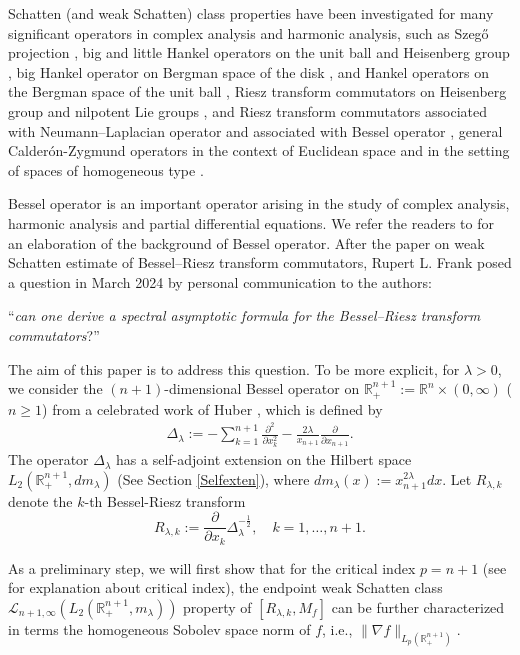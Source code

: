 \documentclass[12pt]{amsart}
\begin{document}
Schatten  (and weak Schatten) class properties have been investigated for many significant operators in complex analysis and harmonic analysis, such as Szeg\H{o} projection \cite{FR}, big and little Hankel operators on the unit ball and  Heisenberg group \cite{FR},  big Hankel operator on Bergman space of the disk  \cite{AFP}, and  Hankel operators on the Bergman space of the unit ball \cite{MR1087805}, Riesz transform commutators on Heisenberg group \cite{MR4552581} and nilpotent Lie groups \cite{MR4756021}, and Riesz transform commutators associated with  Neumann--Laplacian operator \cite{Neumann} and associated with Bessel operator \cite{FLLXarxiv}, general Calder\'{o}n-Zygmund operators in the context of Euclidean space \cite{Zhangwei1,Zhangwei2} and in the setting of spaces of homogeneous type \cite{HRpreprint}.

Bessel operator is an important operator arising in the study of complex analysis, harmonic analysis and partial differential equations. We refer the readers to \cite{MR64284,MS} for an elaboration of the background of Bessel operator. After the paper  \cite{FLLXarxiv} on weak Schatten estimate of Bessel--Riesz transform commutators,
Rupert L. Frank posed a question in March 2024 by personal communication to the authors:

``{\it can one derive a spectral asymptotic formula for the Bessel--Riesz transform commutators}?''

The aim of this paper is to address this question. To be more explicit, for $\lambda> 0$, we consider the $(n+1)$-dimensional Bessel operator on $\mathbb{R}^{n+1}_+:=\mathbb{R}^n\times (0,\infty)$ ($n\geq 1$) from a celebrated work of Huber \cite{MR64284}, which is defined by
\begin{align}\label{Dlambda}
\Delta_\lambda:= -\sum_{k=1}^{n+1}\frac{\partial^2}{\partial x_k^2}-\frac{2\lambda}{x_{n+1}}\frac{\partial}{\partial x_{n+1}}.
\end{align}
The operator $\Delta_\lambda$ has a self-adjoint extension on the Hilbert space $L_2(\mathbb{R}_+^{n+1}, dm_\lambda)$ (See Section \ref{Selfexten}),  where $dm_\lambda(x):=x_{n+1}^{2\lambda}dx.$ Let $R_{\lambda,k}$ denote the $k$-th Bessel-Riesz transform %
$$ R_{\lambda,k} :=\frac{\partial}{\partial x_k} \Delta_\lambda^{-\frac12},\quad k=1,\ldots,n+1. $$


As a preliminary step, we will first show that for the critical index $p=n+1$ (see \cite[Remark 1.6]{FLLXarxiv} for explanation about critical index),  the  endpoint weak Schatten class $\mathcal{L}_{n+1,\infty}(L_2(\mathbb{R}^{n+1}_+,m_{\lambda}))$ property of $[R_{\lambda,k},M_f]$  can be further characterized in terms the homogeneous Sobolev space norm of $f$, i.e., $\|\nabla f\|_{L_p(\mathbb{R}_+^{n+1})}$.
\end{document}
